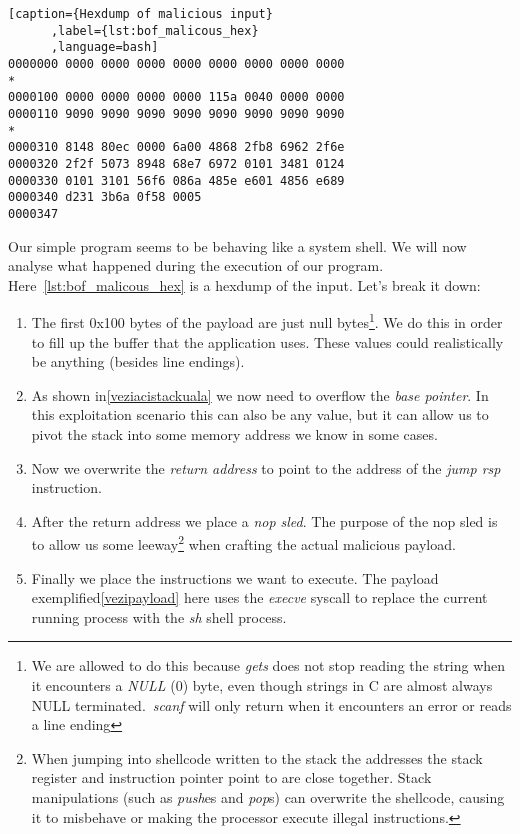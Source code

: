 \documentclass{article}
\begin{document}
\begin{lstlisting}[caption={Hexdump of malicious input}
      ,label={lst:bof_malicous_hex}
      ,language=bash]
0000000 0000 0000 0000 0000 0000 0000 0000 0000
*
0000100 0000 0000 0000 0000 115a 0040 0000 0000
0000110 9090 9090 9090 9090 9090 9090 9090 9090
*
0000310 8148 80ec 0000 6a00 4868 2fb8 6962 2f6e
0000320 2f2f 5073 8948 68e7 6972 0101 3481 0124
0000330 0101 3101 56f6 086a 485e e601 4856 e689
0000340 d231 3b6a 0f58 0005
0000347
\end{lstlisting}
Our simple program seems to be behaving like a system shell. We will now analyse
what happened during the execution of our program. Here~\ref{lst:bof_malicous_hex}
is a hexdump of the input. Let's break it down:
\begin{enumerate}
  \item The first 0x100 bytes of the payload are just null bytes\footnote{We are
  allowed to do this because \emph{gets} does not stop reading the string when it
  encounters a \emph{NULL} (0) byte, even though strings in C are almost always
  NULL terminated.~\emph{scanf} will only return when it encounters an error or
  reads a line ending}. We do this in order to fill up the buffer that the
  application uses. These values could realistically be anything (besides line
  endings).
  \item As shown in\ref{veziacistackuala} we now need to overflow the
  \emph{base pointer}. In this exploitation scenario this can also be any value,
  but it can allow us to pivot the stack into some memory address we know in some cases.
  \item Now we overwrite the \emph{return address} to point to the address of the \emph{jump rsp} instruction.
  \item After the return address we place a \emph{nop sled}. The purpose of the nop
  sled is to allow us some leeway\footnote{When jumping into shellcode written to the stack the addresses the stack register and instruction pointer point to are close together. Stack manipulations (such as \emph{push}es and \emph{pop}s) can overwrite the shellcode, causing it to misbehave or making the processor execute illegal instructions.} when crafting the actual malicious payload.
  \item Finally we place the instructions we want to execute. The payload exemplified\ref{vezipayload} here uses the \emph{execve} syscall to replace the current running
  process with the \emph{sh} shell process.
\end{enumerate}
\end{document}
